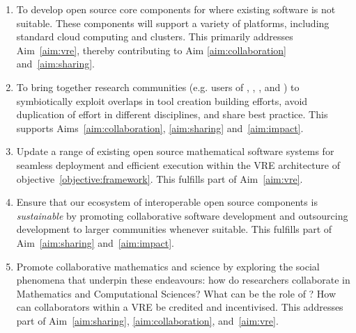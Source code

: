 \documentclass[noworkareas,deliverables,\classoptions]{euproposal}       %
\begin{document}
\begin{proposal}
\begin{enumerate}
\item\label{objectives:core} To develop open source core components
  for \VREs where existing software is not suitable. These components
  will support a variety of platforms, including standard cloud
  computing and clusters. This primarily addresses Aim~\ref{aim:vre},
  thereby contributing to Aim \ref{aim:collaboration}
  and~\ref{aim:sharing}.

\item \label{objective:community} To bring together research
  communities (e.g. users of \Jupyter, \Sage, \Singular, and \GAP) to
  symbiotically exploit overlaps in tool creation building efforts,
  avoid duplication of effort in different disciplines, and share best
  practice. This supports Aims~\ref{aim:collaboration},
  \ref{aim:sharing} and~\ref{aim:impact}.

\item \label{objective:updates} Update a range of existing open source
  mathematical software systems for seamless deployment and efficient
  execution within the VRE architecture of objective~\ref{objective:framework}.
  This fulfills part of Aim~\ref{aim:vre}.



\item \label{objective:sustainable} Ensure that our ecosystem of
  interoperable open source components is \emph{sustainable} by
  promoting collaborative software development and outsourcing
  development to larger communities whenever suitable. This fulfills
  part of Aim~\ref{aim:sharing} and~\ref{aim:impact}.

\item \label{objective:social} Promote collaborative mathematics and
  science by exploring the social phenomena that underpin these
  endeavours: how do researchers collaborate in Mathematics and
  Computational Sciences?  What can be the role of \VREs?  How can
  collaborators within a VRE be credited and incentivised. This
  addresses part of Aim~\ref{aim:sharing}, \ref{aim:collaboration},
  and~\ref{aim:vre}.


\end{enumerate}
\end{proposal}
\end{document}
